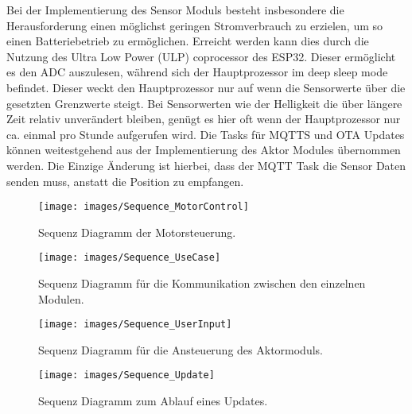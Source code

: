 Bei der Implementierung des Sensor Moduls besteht insbesondere die Herausforderung einen möglichst geringen Stromverbrauch zu erzielen, um so einen Batteriebetrieb zu ermöglichen. Erreicht werden kann dies durch die Nutzung des Ultra Low Power (ULP) coprocessor des ESP32. Dieser ermöglicht es den ADC auszulesen, während sich der Hauptprozessor im deep sleep mode befindet. Dieser weckt den Hauptprozessor nur auf wenn die Sensorwerte über die gesetzten Grenzwerte steigt. Bei Sensorwerten wie der Helligkeit die über längere Zeit relativ unverändert bleiben, genügt es hier oft wenn der Hauptprozessor nur ca. einmal pro Stunde aufgerufen wird. Die Tasks für MQTTS und OTA Updates können weitestgehend aus der Implementierung des Aktor Modules übernommen werden. Die Einzige Änderung ist hierbei, dass der MQTT Task die Sensor Daten senden muss, anstatt die Position zu empfangen.

\begin{figure}[hbt]
	\centering
	\texttt{[image: images/Sequence\_MotorControl]}
	\caption[Sequence Diagramm MotorControl]{Sequenz Diagramm der Motorsteuerung.}
	\label{fig:SequenceMotorControl}
\end{figure}

\begin{figure}[hbt]
	\centering
	\texttt{[image: images/Sequence\_UseCase]}
	\caption[Sequence UseCase]{Sequenz Diagramm für die Kommunikation zwischen den einzelnen Modulen.}
	\label{fig:Sequence_UseCase}
\end{figure}

\begin{figure}[hbt]
	\centering
	\texttt{[image: images/Sequence\_UserInput]}
	\caption[Sequence UserInput]{Sequenz Diagramm für die Ansteuerung des Aktormoduls.}
	\label{fig:Sequence_UserInput}
\end{figure}



\begin{figure}[hbt]
	\centering
	\texttt{[image: images/Sequence\_Update]}
	\caption[Sequence Update]{Sequenz Diagramm zum Ablauf eines Updates.}
	\label{fig:Sequence_Update}
\end{figure}
